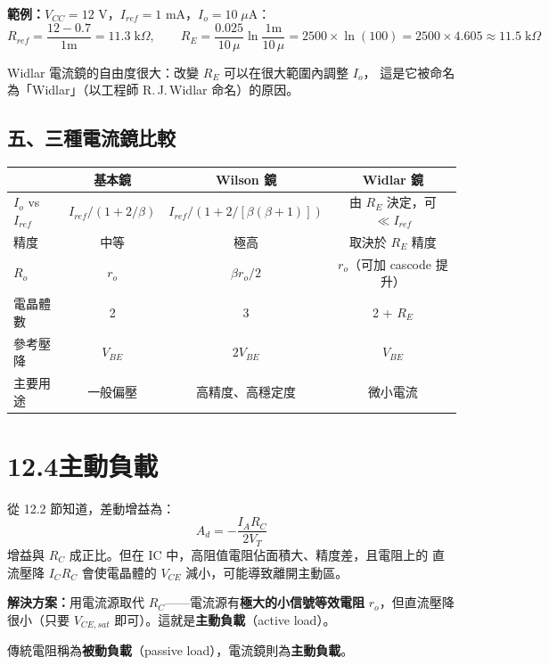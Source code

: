\documentclass[12pt]{article}
\begin{document}
\noindent\textbf{範例：}$V_{CC} = 12$ V，$I_{ref} = 1$ mA，$I_o = 10\;\mu$A：
\[
  R_{ref} = \frac{12 - 0.7}{1\text{m}} = 11.3\;\text{k}\Omega, \qquad
  R_E = \frac{0.025}{10\,\mu}\ln\frac{1\text{m}}{10\,\mu} = 2500 \times \ln(100) = 2500 \times 4.605 \approx 11.5\;\text{k}\Omega
\]

\noindent Widlar 電流鏡的自由度很大：改變 $R_E$ 可以在很大範圍內調整 $I_o$，
這是它被命名為「Widlar」（以工程師 R.\,J.\,Widlar 命名）的原因。

\subsection*{五、三種電流鏡比較}

\begin{center}\small
\begin{tabular}{p{2.8cm}|c|c|c}
\toprule
 & \textbf{基本鏡} & \textbf{Wilson 鏡} & \textbf{Widlar 鏡} \\
\midrule
$I_o$ vs $I_{ref}$ & $I_{ref}/(1+2/\beta)$ & $I_{ref}/(1+2/[\beta(\beta\!+\!1)])$ & 由 $R_E$ 決定，可 $\ll I_{ref}$ \\
精度 & 中等 & 極高 & 取決於 $R_E$ 精度 \\
$R_o$ & $r_o$ & $\beta r_o/2$ & $r_o$（可加 cascode 提升） \\
電晶體數 & 2 & 3 & 2 + $R_E$ \\
參考壓降 & $V_{BE}$ & $2V_{BE}$ & $V_{BE}$ \\
主要用途 & 一般偏壓 & 高精度、高穩定度 & 微小電流 \\
\bottomrule
\end{tabular}
\end{center}

\section*{12.4\quad 主動負載}


\begin{keybox}[為什麼需要主動負載？]
從 12.2 節知道，差動增益為：
\[
  A_d = -\frac{I_A R_C}{2V_T} \tag{12.39}
\]
增益與 $R_C$ 成正比。但在 IC 中，高阻值電阻佔面積大、精度差，且電阻上的
直流壓降 $I_C R_C$ 會使電晶體的 $V_{CE}$ 減小，可能導致離開主動區。

\medskip
\textbf{解決方案：}用電流源取代 $R_C$——電流源有\textbf{極大的小信號等效電阻}
$r_o$，但直流壓降很小（只要 $V_{CE,sat}$ 即可）。這就是\textbf{主動負載}（active load）。

傳統電阻稱為\textbf{被動負載}（passive load），電流鏡則為\textbf{主動負載}。
\end{keybox}
\end{document}

